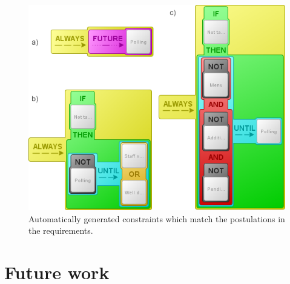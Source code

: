 \documentclass[conference]{IEEEtran}
\begin{document}

\begin{figure}[htbp]
  \centering
  \includegraphics[width=\linewidth]{generatedconstraints} %
  \caption{Automatically generated constraints which match the postulations in the requirements.}
  \label{fig:generatedconstraints}
\end{figure}






\section{Future work}
\end{document}
